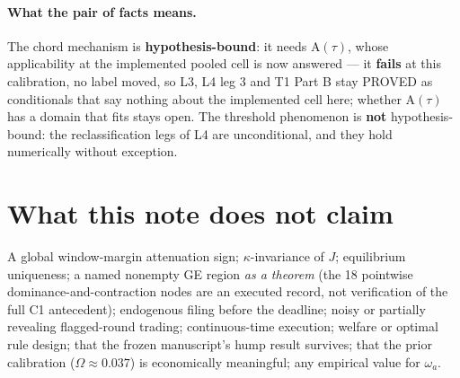 \documentclass[11pt,a4paper]{article}
\newcommand{\Atau}{\mathrm{A}(\tau)}
\begin{document}
\paragraph{What the pair of facts means.} The chord mechanism is
\textbf{hypothesis-bound}: it needs $\Atau$, whose applicability at the implemented
pooled cell is now answered --- it \textbf{fails} at this calibration, no label moved,
so L3, L4 leg 3 and T1 Part B stay PROVED as conditionals that say nothing about the
implemented cell here; whether $\Atau$ has a domain that fits stays open. The
threshold phenomenon is \textbf{not} hypothesis-bound: the reclassification legs of L4
are unconditional, and they hold numerically without exception.

\section{What this note does not claim}

A global window-margin attenuation sign; $\kappa$-invariance of $J$; equilibrium
uniqueness; a named nonempty GE region \emph{as a theorem} (the 18 pointwise
dominance-and-contraction nodes are an executed record, not verification of the full
C1 antecedent); endogenous filing before the deadline; noisy or partially revealing
flagged-round trading;
continuous-time execution; welfare or optimal rule design; that the frozen
manuscript's hump result survives; that the prior calibration
($\Omega\approx0.037$) is economically meaningful; any empirical value for
$\omega_a$.
\end{document}
